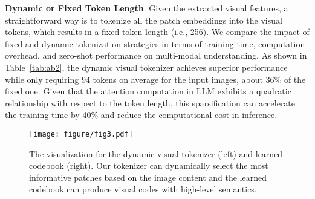 \textbf{Dynamic or Fixed Token Length}. Given the extracted visual features, a straightforward way is to tokenize all the patch embeddings into the visual tokens, which results in a fixed token length (i.e., 256). We compare the impact of fixed and dynamic tokenization strategies in terms of training time, computation overhead, and zero-shot performance on multi-modal understanding. As shown in Table~\ref{tab:ab2}, the dynamic visual tokenizer achieves superior performance while only requiring 94 tokens on average for the input images, about 36\% of the fixed one. Given that the attention computation in LLM exhibits a quadratic relationship with respect to the token length, this sparsification can accelerate the training time by 40\% and reduce the computational cost in inference.

\begin{figure}[t]
\begin{center}
\texttt{[image: figure/fig3.pdf]}
\vspace{-0.1in}
\end{center}
  \caption{\small The visualization for the dynamic visual tokenizer (left) and learned codebook (right). Our tokenizer can dynamically select the most informative patches based on the image content and the learned codebook can produce visual codes with high-level semantics.}
\label{fig:fig3}
\vspace{-0.2in}
\end{figure}

